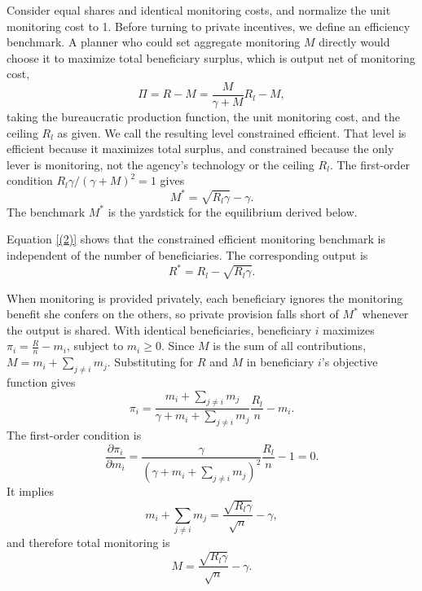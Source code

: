 \documentclass[12pt]{article}
\begin{document}
Consider equal shares and identical monitoring costs, and normalize the unit monitoring cost to 1. Before turning to private incentives, we define an efficiency benchmark. A planner who could set aggregate monitoring $M$ directly would choose it to maximize total beneficiary surplus, which is output net of monitoring cost,
\[
    \Pi = R - M = \frac{M}{\gamma + M} R_l - M,
\]
taking the bureaucratic production function, the unit monitoring cost, and the ceiling $R_l$ as given. We call the resulting level constrained efficient. That level is efficient because it maximizes total surplus, and constrained because the only lever is monitoring, not the agency's technology or the ceiling $R_l$. The first-order condition $R_l\gamma/(\gamma + M)^2 = 1$ gives
\begin{equation} \label{(2)}
    M^* = \sqrt{R_l \gamma} - \gamma.
\end{equation}
The benchmark $M^*$ is the yardstick for the equilibrium derived below.

Equation \eqref{(2)} shows that the constrained efficient monitoring benchmark is independent of the number of beneficiaries. The corresponding output is 
\begin{equation} \label{(3)}
    R^*=R_l-\sqrt{R_l \gamma}.
\end{equation}

When monitoring is provided privately, each beneficiary ignores the monitoring benefit she confers on the others, so private provision falls short of $M^*$ whenever the output is shared. With identical beneficiaries, beneficiary $i$ maximizes $\displaystyle \pi_i=\frac{R}{n}-m_i$, subject to $m_i \geq 0$. Since $M$ is the sum of all contributions, $M=m_i+\sum_{j\neq i} m_j$. Substituting for $R$ and $M$ in beneficiary $i$'s objective function gives
\[
\pi_i=\frac{m_i+\sum_{j\neq i} m_j}{\gamma + m_i+\sum_{j\neq i} m_j} \frac{R_l}{n}-m_i.
\]
The first-order condition is
\begin{equation}
    \frac{\partial \pi_i}{\partial m_i} = \frac{\gamma}{(\gamma + m_i +\sum_{j\neq i} m_j)^2} \frac{R_l}{n} - 1 = 0. \nonumber
\end{equation}
It implies
\begin{equation}
    m_i + \sum_{j\neq i} m_j = \frac{\sqrt{R_l\gamma}}{\sqrt{n}}-\gamma, \nonumber
\end{equation}
and therefore total monitoring is
\begin{equation} \label{(4)}
    M = \frac{\sqrt{R_l \gamma}}{\sqrt{n}}-\gamma.
\end{equation}
\end{document}
